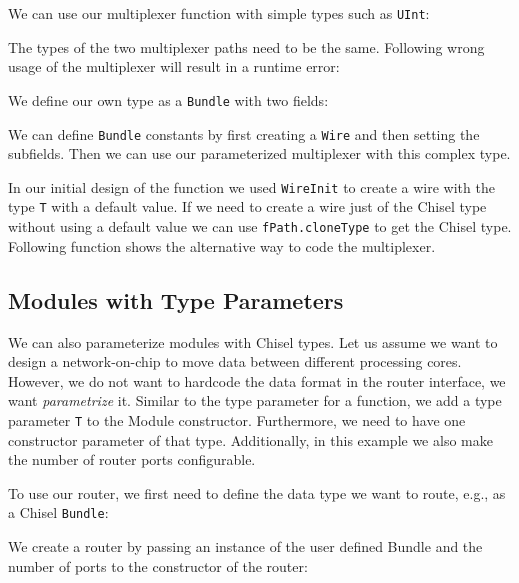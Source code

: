 \documentclass[%
    10pt,
    headinclude, footexclude,
    openright, %
    notitlepage,
    cleardoubleempty,
    headsepline,
    pointlessnumbers,
    bibtotoc, idxtotoc,
    ]{scrbook}
\newcommand{\code}[1]{{\small{\texttt{#1}}}}
\begin{document}
We can use our multiplexer function with simple types such as
\code{UInt}:


\noindent The types of the two multiplexer paths need to be the same.
Following wrong usage of the multiplexer will result in a runtime error:


\noindent We define our own type as a \code{Bundle} with two fields:


\noindent We can define \code{Bundle} constants by first creating
a \code{Wire} and then setting the subfields.
Then we can use our parameterized multiplexer with this complex type.


In our initial design of the function we used \code{WireInit}
to create a wire with the type \code{T} with a default value.
If we need to create a wire just of the Chisel type without using a default
value we can use \code{fPath.cloneType} to get the Chisel type.
Following function shows the alternative way to code the multiplexer.


\subsection{Modules with Type Parameters}

We can also parameterize modules with Chisel types.
Let us assume we want to design a network-on-chip to move data between
different processing cores. However, we do not want to hardcode the
data format in the router interface, we want \emph{parametrize} it.
Similar to the type parameter for a function, we add a type parameter \code{T}
to the Module constructor. Furthermore, we need to have one constructor
parameter of that type. Additionally, in this example we also make the number
of router ports configurable.


\noindent To use our router, we first need to define the data type we want to route, e.g.,
as a Chisel \code{Bundle}:


\noindent We create a router by passing an instance of the user defined Bundle and
the number of ports to the constructor of the router:
\end{document}
